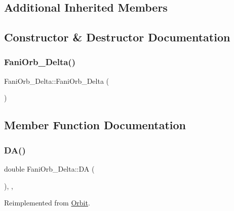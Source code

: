 \subsection*{Additional Inherited Members}


\subsection{Constructor \& Destructor Documentation}
\mbox{\label{class_fani_orb___delta_ab94ffcdcf6fe420db3e860e4d24eb0f6}} 
\subsubsection{\texorpdfstring{Fani\+Orb\+\_\+\+Delta()}{FaniOrb\_Delta()}}
{\footnotesize\ttfamily Fani\+Orb\+\_\+\+Delta\+::\+Fani\+Orb\+\_\+\+Delta (\begin{DoxyParamCaption}{ }\end{DoxyParamCaption})\hspace{0.3cm}{\ttfamily [inline]}}



\subsection{Member Function Documentation}
\mbox{\label{class_fani_orb___delta_ad61e16d6c8f9a2b11940bc21d1362e9c}} 
\subsubsection{\texorpdfstring{D\+A()}{DA()}}
{\footnotesize\ttfamily double Fani\+Orb\+\_\+\+Delta\+::\+DA (\begin{DoxyParamCaption}{ }\end{DoxyParamCaption})\hspace{0.3cm}{\ttfamily [override]}, {\ttfamily [private]}, {\ttfamily [virtual]}}



Reimplemented from \hyperlink{class_orbit_a258deda1207d23b2ce6285b55e216d4f}{Orbit}.

